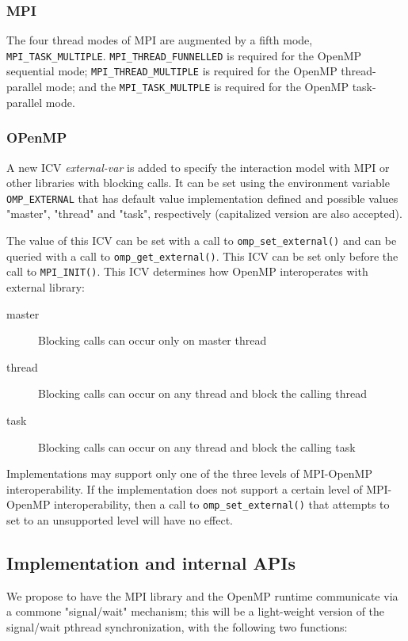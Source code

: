 \documentclass[twoside,11pt]{article}
\begin{document}
\subsubsection{MPI}
The four thread modes of MPI are augmented by a fifth mode, 
\texttt{MPI\_TASK\_MULTIPLE}. \texttt{MPI\_THREAD\_FUNNELLED} is required for 
the OpenMP sequential mode; \texttt{MPI\_THREAD\_MULTIPLE} is required for the 
OpenMP thread-parallel mode; and the \texttt{MPI\_TASK\_MULTPLE} is required 
for the OpenMP task-parallel mode.  
\subsubsection{OPenMP}
A new ICV \emph{external-var} is added to specify the interaction model with 
MPI or other libraries with blocking calls.
It can be set using the environment variable \texttt{OMP\_EXTERNAL} that has 
default 
value implementation defined and possible values  "master", 
"thread" and "task", respectively (capitalized version are 
also accepted).

The value of this ICV can be set with a call to \texttt{omp\_set\_external()} 
and 
can 
be queried with a call to \texttt\texttt{omp\_get\_external()}. This ICV can be 
set 
only before the call to \texttt{MPI\_INIT()}. This ICV determines how OpenMP 
interoperates with external library: 
\begin{description}
	\item[master] Blocking calls can occur only on master thread
	\item[thread] Blocking calls can occur on any thread and block the calling 
	thread
	\item[task] Blocking calls can occur on any thread and block the calling 
	task
\end{description}

Implementations may support only one of the three levels of MPI-OpenMP 
interoperability. If the implementation does not support a certain level of 
MPI-OpenMP interoperability, then a call to \texttt{omp\_set\_external()} that 
attempts to set to an unsupported level will have no effect.

\subsection{Implementation and internal APIs}
We propose to have the MPI library and the OpenMP runtime communicate via a 
commone "signal/wait" mechanism; this will be a light-weight version of the 
signal/wait pthread synchronization, with the following two functions:
\end{document}
